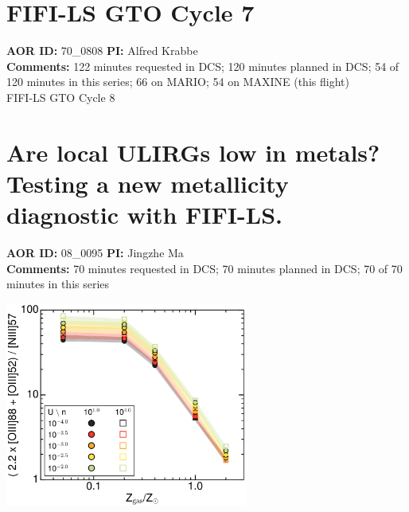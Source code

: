 \documentclass[10pt]{article}
\begin{document}
\section{FIFI-LS GTO Cycle 7}
{\large {\bf AOR ID:} 70\_0808 {\bf PI:} Alfred Krabbe}\\
{\bf Comments:}  122 minutes requested in DCS;  120 minutes planned in DCS;  54 of 120 minutes in this series;  66 on MARIO;  54 on MAXINE (this flight)\\
\newline
FIFI-LS GTO Cycle 8
\section{Are local ULIRGs low in metals? Testing a new metallicity diagnostic with FIFI-LS.}
{\large {\bf AOR ID:} 08\_0095 {\bf PI:} Jingzhe Ma}\\
{\bf Comments:}  70 minutes requested in DCS;  70 minutes planned in DCS;  70 of 70 minutes in this series\\
\begin{center}
\includegraphics[width=0.60\textwidth]{../test/08_0095/1.png}
\end{center}
\end{document}
